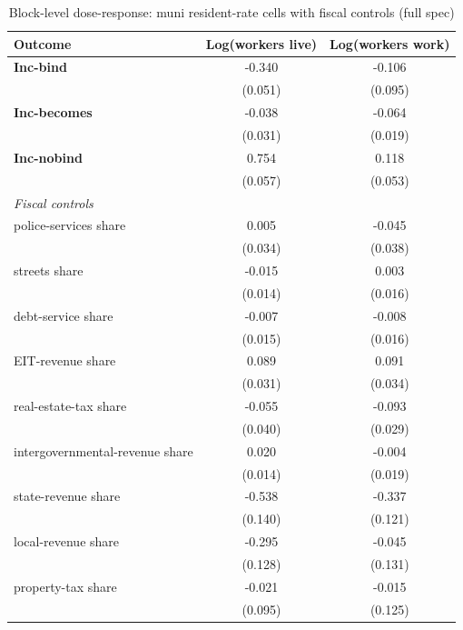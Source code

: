\begin{table}[!htbp]
  \centering
  \caption{Block-level dose-response: muni resident-rate cells with fiscal controls (full spec)}
  \label{tab:app_full_block_muni_results}
  \footnotesize
  \renewcommand{\arraystretch}{0.9}
  \begin{tabular}{lcc}
    \toprule
    Outcome & Log(workers live) & Log(workers work) \\
    \midrule
    \textbf{Inc-bind} & -0.340\sym{***} & -0.106 \\
                      & (0.051) & (0.095) \\
    \textbf{Inc-becomes} & -0.038 & -0.064\sym{***} \\
                      & (0.031) & (0.019) \\
    \textbf{Inc-nobind} & 0.754\sym{***} & 0.118\sym{**} \\
                      & (0.057) & (0.053) \\
    \midrule
    \multicolumn{3}{l}{\textit{Fiscal controls}} \\
    police-services share & 0.005 & -0.045 \\
                      & (0.034) & (0.038) \\
    streets share & -0.015 & 0.003 \\
                      & (0.014) & (0.016) \\
    debt-service share & -0.007 & -0.008 \\
                      & (0.015) & (0.016) \\
    EIT-revenue share & 0.089\sym{***} & 0.091\sym{***} \\
                      & (0.031) & (0.034) \\
    real-estate-tax share & -0.055 & -0.093\sym{***} \\
                      & (0.040) & (0.029) \\
    intergovernmental-revenue share & 0.020 & -0.004 \\
                      & (0.014) & (0.019) \\
    state-revenue share & -0.538\sym{***} & -0.337\sym{***} \\
                      & (0.140) & (0.121) \\
    local-revenue share & -0.295\sym{**} & -0.045 \\
                      & (0.128) & (0.131) \\
    property-tax share & -0.021 & -0.015 \\
                      & (0.095) & (0.125) \\

\end{tabular}
\end{table}
